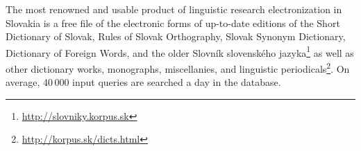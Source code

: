 The most renowned and usable product of linguistic research
electronization in Slovakia is a free file of the electronic forms of
up-to-date editions of the Short Dictionary of Slovak, Rules of Slovak
Orthography, Slovak Synonym Dictionary, Dictionary of Foreign Words, and
the older Slovník slovenského
jazyka\footnote{\url{http://slovniky.korpus.sk}} as well as other
dictionary works, monographs, miscellanies, and linguistic
periodicals\footnote{\url{http://korpus.sk/dicts.html}}. On average,
40\,000 input queries are searched a day in the database.
